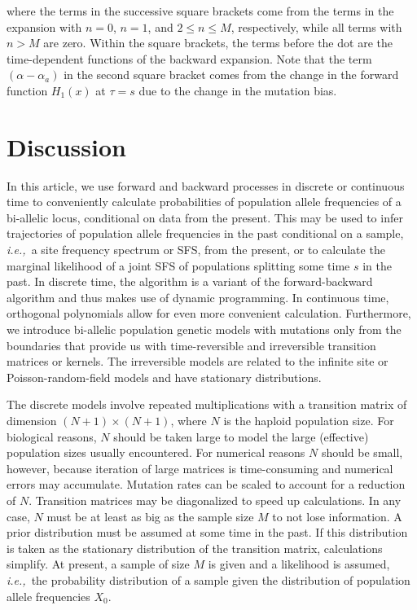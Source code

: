 \documentclass[preprint]{elsarticle}
\newcommand\ie{{\it i.e.,}}
\newcommand\x[1]{\ensuremath{X_{#1}}}
\begin{document}
where the terms in the successive square brackets come from the terms in the expansion with $n=0$, $n=1$, and $2\leq n\leq M$, respectively, while all terms with $n>M$ are zero. Within the square brackets, the terms before the dot are the time-dependent functions of the backward expansion. Note that the term $(\alpha-\alpha_a)$ in the second square bracket comes from the change in the forward function $H_1(x)$ at $\tau=s$  due to the change in the mutation bias. 

\section{Discussion}

In this article, we use forward and backward processes in discrete or continuous time to conveniently calculate probabilities of population allele frequencies of a bi-allelic locus, conditional on data from the present. This may be used to infer trajectories of population allele frequencies in the past conditional on a sample, \ie\ a site frequency spectrum or SFS, from the present, or to calculate the marginal likelihood of a joint SFS of populations splitting some time $s$ in the past. In discrete time, the algorithm is a variant of the forward-backward algorithm and thus makes use of dynamic programming. In continuous time, orthogonal polynomials allow for even more convenient calculation. Furthermore, we introduce bi-allelic population genetic models with mutations only from the boundaries that provide us with time-reversible and irreversible transition matrices or kernels. The irreversible models are related to the infinite site \citep{Kimu69,Evan07} or Poisson-random-field models \citep{Sawy92} and have stationary distributions.

The discrete models involve repeated multiplications with a transition matrix of dimension $(N+1)\times(N+1)$, where $N$ is the haploid population size. For biological reasons, $N$ should be taken large to model the large (effective) population sizes usually encountered. For numerical reasons $N$ should be small, however, because iteration of large matrices is time-consuming and numerical errors may accumulate. Mutation rates can be scaled to account for a reduction of $N$. Transition matrices may be diagonalized to speed up calculations. In any case, $N$ must be at least as big as the sample size $M$ to not lose information. A prior distribution must be assumed at some time in the past. If this distribution is taken as the stationary distribution of the transition matrix, calculations simplify. At present, a sample of size $M$ is given and a likelihood is assumed, \ie\ the probability distribution of a sample given the distribution of population allele frequencies $\x{0}$.
\end{document}
